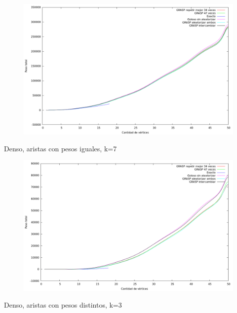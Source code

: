 \begin{figure}[H]
  \begin{center}
    \includegraphics[scale=0.35]{imagenes/ej6-denso-pesos-iguales-k3-peso.png}
  \end{center}
\end{figure}

Denso, aristas con pesos iguales, k=7

\begin{figure}[H]
  \begin{center}
    \includegraphics[scale=0.35]{imagenes/ej6-denso-pesos-iguales-k7-peso.png}
  \end{center}
\end{figure}

Denso, aristas con pesos distintos, k=3

